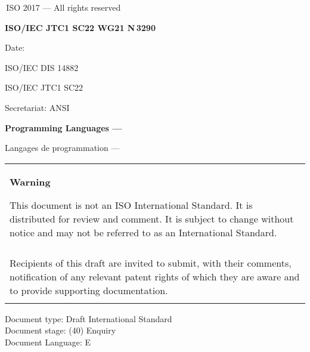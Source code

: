 

\thispagestyle{empty}
{\raisebox{.35ex}{\smaller\copyright}}\,ISO 2017 --- All rights reserved
\vspace{2ex}

\begin{flushright}
	\textbf{ISO/IEC JTC1 SC22 WG21 N\,\LARGE3290}
	
	Date: \reldate
	
	ISO/IEC DIS 14882
	
	ISO/IEC JTC1 SC22
	
	Secretariat: ANSI
	
\end{flushright}

\vfill

\textbf{\LARGE Programming Languages --- \Cpp}

Langages de programmation --- \Cpp

\vfill

\begin{tabular}{|p{\hsize}|}
	\hline
	\begin{center}
		\textbf{Warning}
	\end{center}
	
	\vspace{2ex}
	
	This document is not an ISO International Standard. It is distributed
	for review and comment. It is subject to change without notice and may
	not be referred to as an International Standard.\\\\
	
	Recipients of this draft are invited to submit, with their comments,
	notification of any relevant patent rights of which they are aware
	and to provide supporting documentation.\\\\
	\hline
\end{tabular}

\vfill
\noindent
Document type: Draft International Standard\\
Document stage: (40) Enquiry\\
Document Language: E
\pagebreak

\thispagestyle{cpppage}

